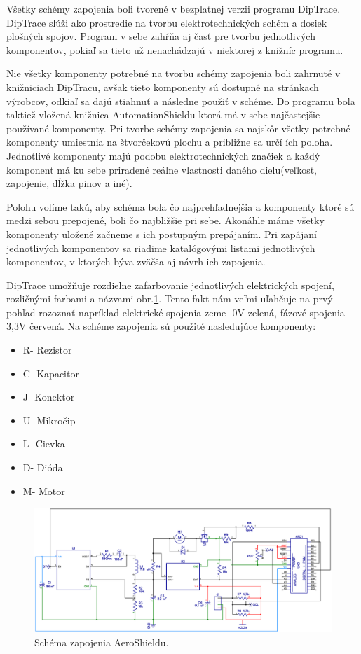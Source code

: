 Všetky schémy zapojenia boli tvorené v bezplatnej verzii programu DipTrace. DipTrace slúži ako prostredie na tvorbu elektrotechnických schém a dosiek plošných spojov. Program v sebe zahŕňa aj časť pre tvorbu jednotlivých komponentov, pokiaľ sa tieto už nenachádzajú v niektorej z knižníc programu.

Nie všetky komponenty potrebné na tvorbu schémy zapojenia boli zahrnuté v knižniciach DipTracu, avšak tieto komponenty sú dostupné na stránkach výrobcov, odkiaľ sa dajú stiahnuť a následne použiť v schéme\cite{AS5600Downl}\cite{TPS56339Downl}\cite{INAobr}. Do programu bola taktiež vložená knižnica AutomationShieldu ktorá má v sebe najčastejšie používané komponenty. Pri tvorbe schémy zapojenia sa najskôr všetky potrebné komponenty umiestnia na štvorčekovú plochu a približne sa určí ích poloha. Jednotlivé komponenty majú podobu elektrotechnických značiek a každý komponent má ku sebe priradené reálne vlastnosti daného dielu(veľkosť, zapojenie, dĺžka pinov a iné).

Polohu volíme takú, aby schéma bola čo najprehľadnejšia a komponenty ktoré sú medzi sebou prepojené, boli čo najbližšie pri sebe. Akonáhle máme všetky komponenty uložené začneme s ich postupným prepájaním. Pri zapájaní jednotlivých komponentov sa riadime katalógovými listami jednotlivých komponentov, v ktorých býva zväčša aj návrh ich zapojenia.

DipTrace umožňuje rozdielne zafarbovanie jednotlivých elektrických spojení, rozličnými farbami a názvami obr.\ref{OBRAZOK 2.3.5}. Tento fakt nám veľmi uľahčuje na prvý pohľad rozoznať napríklad elektrické spojenia zeme- 0V zelená, fázové spojenia- 3,3V červená. Na schéme zapojenia sú použité nasledujúce komponenty:
\begin{multicols}{3}
	\begin{itemize}
		\item R- Rezistor
		\item C- Kapacitor
		\item J- Konektor
		\item U- Mikročip
		\item L- Cievka
		\item D- Dióda
		\item M- Motor
	\end{itemize}
\end{multicols}


\begin{figure}[!tbh]
	\includegraphics[width=\textwidth]{obr/aeroSchema.png}
	\caption{Schéma zapojenia AeroShieldu.}\label{OBRAZOK 2.3.5}
\end{figure}

